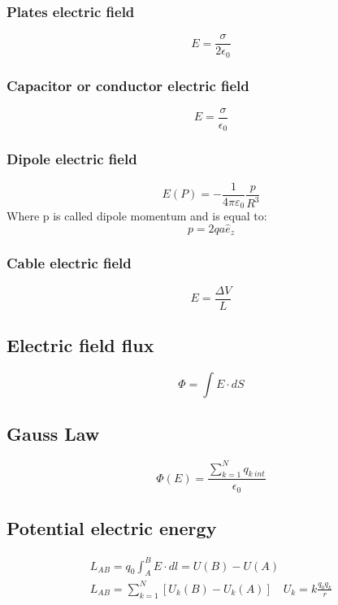 \documentclass[Master.tex]{subfiles}
\begin{document}
\begin{multicols}{2}
				   \subsubsection{Plates electric field}
						    \[
								     E = \frac{\sigma }{2 \epsilon_{0}  }
						    \]

				   \subsubsection{Capacitor or conductor electric field}
						    \[
								     E = \frac{\sigma }{\epsilon _{0} }
						    \]

				   \subsubsection{Dipole electric field}
						    \[
								     E(P) =  -\frac{1}{4 \pi  \varepsilon_{0}}  \frac{p}{R^3}
						    \]
						    Where p is called dipole momentum and is equal to:
						    \[
								     p = 2qa\hat{e}_{z}
						    \]

				   \subsubsection{Cable electric field}
						    \[
								     E = \frac{\Delta V}{L}
						    \]

		  \subsection{Electric field flux}

				   \[
						    \Phi = \int E \cdot dS
				   \]

		  \subsection{Gauss Law}
				   \[
						    \Phi (E) =  \frac{\sum_{k=1}^{N} q_{k~int} }{\epsilon _{0} }
				   \]

		  \subsection{Potential electric energy}
				   \begin{gather*}
						    L_{AB} = q_{0} \int_{A}^{B} E \cdot dl = U(B) - U(A)\\
						    L_{AB} = \sum_{k=1}^{N} [U_{k}(B)  - U_{k}(A)] \quad U_{k} = k \frac{q_0 q_{k} }{r}
				   \end{gather*}


\end{multicols}
\end{document}
